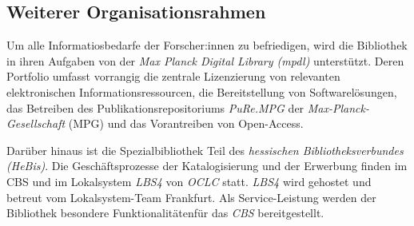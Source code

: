 \subsection{Weiterer Organisationsrahmen}
Um alle Informatiosbedarfe der Forscher:innen zu befriedigen, wird die Bibliothek in ihren Aufgaben von der
\textit{Max Planck Digital Library ({mpdl})} unterstützt. Deren Portfolio umfasst vorrangig die zentrale 
Lizenzierung von relevanten elektronischen Informationsressourcen, die Bereitstellung von Softwarelösungen, 
das Betreiben des Publikationsrepositoriums \textit{PuRe.MPG} der \textit{Max-Planck-Gesellschaft} (MPG) und
das Vorantreiben von Open-Access. 

Darüber hinaus ist die Spezialbibliothek Teil des \textit{hessischen Bibliotheksverbundes (HeBis)}. 
Die Geschäftsprozesse der Katalogisierung und der Erwerbung finden im \acrlong{CBS} und 
im Lokalsystem \textit{LBS4} von \textit{OCLC} statt. \textit{LBS4} wird gehostet und betreut vom Lokalsystem-Team Frankfurt. 
Als Service-Leistung werden der Bibliothek besondere Funktionalitätenfür das \textit{CBS} bereitgestellt.

